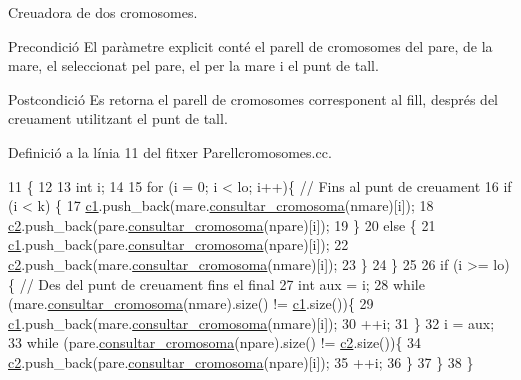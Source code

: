 Creuadora de dos cromosomes. 

\begin{DoxyPrecond}{Precondició}
El paràmetre explicit conté el parell de cromosomes del pare, de la mare, el seleccionat pel pare, el per la mare i el punt de tall. 
\end{DoxyPrecond}
\begin{DoxyPostcond}{Postcondició}
Es retorna el parell de cromosomes corresponent al fill, després del creuament utilitzant el punt de tall. 
\end{DoxyPostcond}


Definició a la línia 11 del fitxer Parellcromosomes.\+cc.


\begin{DoxyCode}
11                                                                                                            
               \{
12     
13     \textcolor{keywordtype}{int} i;
14     
15     \textcolor{keywordflow}{for} (i = 0; i < lo; i++)\{ \textcolor{comment}{// Fins al punt de creuament}
16         \textcolor{keywordflow}{if} (i < k) \{
17             \hyperlink{class_parell__cromosomes_ab7f48c884531da8e1fe3a08d80235c9a}{c1}.push\_back(mare.\hyperlink{class_parell__cromosomes_ac031fd24ba85d2bc3384afaf6c81ac23}{consultar\_cromosoma}(nmare)[i]);
18             \hyperlink{class_parell__cromosomes_a6e3169a9ca8b8d508ce1c0143a5b4a82}{c2}.push\_back(pare.\hyperlink{class_parell__cromosomes_ac031fd24ba85d2bc3384afaf6c81ac23}{consultar\_cromosoma}(npare)[i]);
19         \}
20         \textcolor{keywordflow}{else} \{
21             \hyperlink{class_parell__cromosomes_ab7f48c884531da8e1fe3a08d80235c9a}{c1}.push\_back(pare.\hyperlink{class_parell__cromosomes_ac031fd24ba85d2bc3384afaf6c81ac23}{consultar\_cromosoma}(npare)[i]);
22             \hyperlink{class_parell__cromosomes_a6e3169a9ca8b8d508ce1c0143a5b4a82}{c2}.push\_back(mare.\hyperlink{class_parell__cromosomes_ac031fd24ba85d2bc3384afaf6c81ac23}{consultar\_cromosoma}(nmare)[i]);
23         \}
24     \}
25     
26     \textcolor{keywordflow}{if} (i >= lo)\{ \textcolor{comment}{// Des del punt de creuament fins el final}
27         \textcolor{keywordtype}{int} aux = i;
28         \textcolor{keywordflow}{while} (mare.\hyperlink{class_parell__cromosomes_ac031fd24ba85d2bc3384afaf6c81ac23}{consultar\_cromosoma}(nmare).size() != \hyperlink{class_parell__cromosomes_ab7f48c884531da8e1fe3a08d80235c9a}{c1}.size())\{
29             \hyperlink{class_parell__cromosomes_ab7f48c884531da8e1fe3a08d80235c9a}{c1}.push\_back(mare.\hyperlink{class_parell__cromosomes_ac031fd24ba85d2bc3384afaf6c81ac23}{consultar\_cromosoma}(nmare)[i]);
30             ++i;
31         \}
32         i = aux;
33         \textcolor{keywordflow}{while} (pare.\hyperlink{class_parell__cromosomes_ac031fd24ba85d2bc3384afaf6c81ac23}{consultar\_cromosoma}(npare).size() != \hyperlink{class_parell__cromosomes_a6e3169a9ca8b8d508ce1c0143a5b4a82}{c2}.size())\{
34             \hyperlink{class_parell__cromosomes_a6e3169a9ca8b8d508ce1c0143a5b4a82}{c2}.push\_back(pare.\hyperlink{class_parell__cromosomes_ac031fd24ba85d2bc3384afaf6c81ac23}{consultar\_cromosoma}(npare)[i]);
35             ++i;
36         \}
37     \}
38 \}
\end{DoxyCode}
